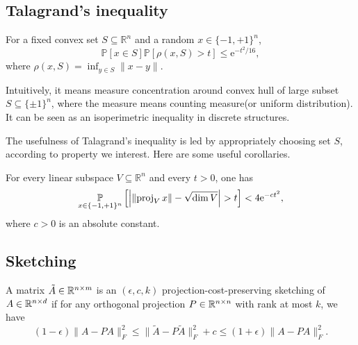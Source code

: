 \subsection{Talagrand's inequality}
\begin{thm}
\label{tal_ineq}
For a fixed convex set $S \subseteq \mathbb{R}^n$ and a random $x \in\{-1,+1\}^n$,
$$
\mathbb{P}[x \in S] \mathbb{P}[\rho(x, S)>t] \leq \mathrm{e}^{-t^2 / 16},
$$
where $\rho(x, S)=\inf _{y \in S}\|x-y\|$.
\end{thm}
Intuitively, it means measure concentration around convex hull of large subset $S\subseteq\{\pm 1\}^n$, where the measure means counting measure(or uniform distribution). It can be seen as an isoperimetric inequality in discrete structures.

The usefulness of Talagrand's inequality is led by appropriately choosing set $S$, according to property we interest. Here are some useful corollaries.
\begin{cor}
\label{tal_ineq_proj}
For every linear subspace $V \subseteq \mathbb{R}^n$ and every $t>0$, one has
$$
\underset{x \in\{-1,+1\}^n}{\mb{P}}\left[\left|\left\|\operatorname{proj}_V x\right\|-\sqrt{\operatorname{dim} V}\right|>t\right]<4 \mathrm{e}^{-c t^2},
$$
where $c>0$ is an absolute constant.
\end{cor}
\subsection{Sketching}
\begin{defn}
\label{proj_preserve_def}
A matrix $\tilde{A}\in\mathbb{R}^{n\times m}$ is an $(\epsilon,c,k)$ projection-cost-preserving sketching of $A\in\mathbb{R}^{n\times d}$ if for any orthogonal projection $P\in\mathbb{R}^{n\times n}$ with rank at most $k$, we have
\[(1-\epsilon)\|A-PA\|_F^2\le\|\tilde{A}-P\tilde{A}\|_F^2+c\le (1+\epsilon)\|A-PA\|_F^2.\]
\end{defn}

